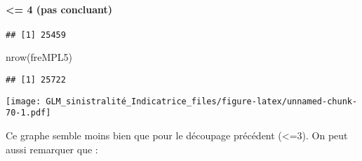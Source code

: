 \documentclass[
]{article}
\newenvironment{Shaded}{\begin{snugshade}}{\end{snugshade}}
\newcommand{\AttributeTok}[1]{\textcolor[rgb]{0.77,0.63,0.00}{#1}}
\newcommand{\DecValTok}[1]{\textcolor[rgb]{0.00,0.00,0.81}{#1}}
\newcommand{\FunctionTok}[1]{\textcolor[rgb]{0.00,0.00,0.00}{#1}}
\newcommand{\NormalTok}[1]{#1}
\newcommand{\OtherTok}[1]{\textcolor[rgb]{0.56,0.35,0.01}{#1}}
\newcommand{\SpecialCharTok}[1]{\textcolor[rgb]{0.00,0.00,0.00}{#1}}
\newcommand{\StringTok}[1]{\textcolor[rgb]{0.31,0.60,0.02}{#1}}
\begin{document}
\hypertarget{pas-concluant-1}{%
\paragraph{\textless= 4 (pas concluant)}\label{pas-concluant-1}}

\begin{Shaded}
\end{Shaded}

\begin{verbatim}
## [1] 25459
\end{verbatim}

\begin{Shaded}
\begin{Highlighting}[]
\FunctionTok{nrow}\NormalTok{(freMPL5)}
\end{Highlighting}
\end{Shaded}

\begin{verbatim}
## [1] 25722
\end{verbatim}

\begin{Shaded}
\end{Shaded}

\texttt{[image: GLM\_sinistralité\_Indicatrice\_files/figure-latex/unnamed-chunk-70-1.pdf]}

Ce graphe semble moins bien que pour le découpage précédent
(\textless=3). On peut aussi remarquer que :
\end{document}

